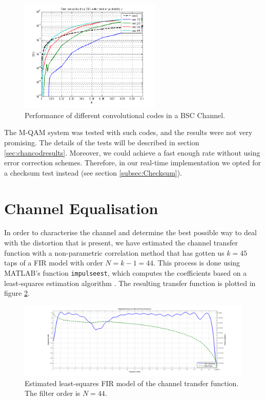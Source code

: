 \documentclass[12pt,a4paper,openright]{report}
\begin{document}
\begin{figure}[h]
  \centering
    \includegraphics[width=0.6\textwidth]{bscconv.png}
    \caption[Performance of different convolutional codes in a BSC Channel.]{Performance of different convolutional codes in a BSC Channel.}
    \label{fig:convBSC}
\end{figure}


The M-QAM system was tested with such codes, and the results were not very promising. The details of the tests will be described in section \ref{sec:chancodresults}. Moreover, we could achieve a fast enough  rate without using error correction schemes. Therefore, in our  real-time implementation we opted for a checksum test instead (see section \ref{subsec:Checksum}). 


\section{Channel Equalisation}
\label{sec:EQdesign}
In order to characterise the channel and determine the best possible way to deal with the distortion that is present, we have estimated the channel transfer function with a non-parametric correlation method that has gotten us $k=45$ taps of a FIR model with order $N=k-1=44$. This process is done using MATLAB's function \texttt{impulseest}, which computes the coefficients based on a least-squares estimation algorithm \cite{MATLABimpulseest}. The resulting transfer function is plotted in figure \ref{fig:FIRtf}. 
 
 
\begin{figure}[h]
  \centering
    \includegraphics[width=1\textwidth]{FIRChanRespose.png}
    \caption[Estimated least-squares FIR model for the channel transfer function]{Estimated least-squares FIR model of the channel transfer function. The filter order is $N=44$.}
    \label{fig:FIRtf}
\end{figure}
\end{document}
